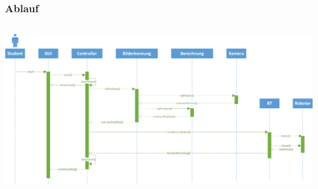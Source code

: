 \begin{frame}
    \frametitle{Ablauf}
    \begin{columns}
        \begin{column}{1\textwidth}
            \centering
            \includegraphics[width=1.0\textwidth]{../doc/fig/Sequenzdiagramm.png}
        \end{column}
    \end{columns}
\end{frame}

